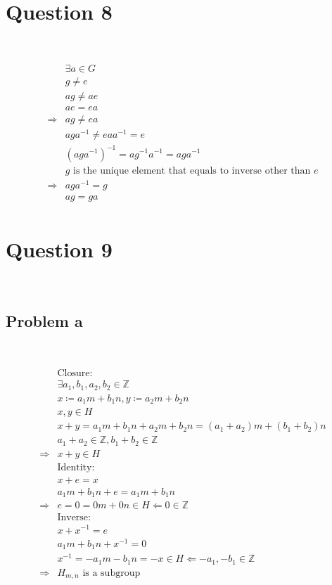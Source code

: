 \documentclass{article}
\begin{document}
\newpage

\section*{Question 8}

~

\begin{equation*}
    \begin{split}
        &\exists a\in G\\
        &g\ne e\\
        &ag\ne ae\\
        &ae=ea\\
        \Rightarrow&ag\ne ea\\
        &aga^{-1}\ne eaa^{-1}=e\\
        &(aga^{-1})^{-1}=ag^{-1}a^{-1}=aga^{-1}\\
        &g\text{ is the unique element that equals to inverse other than }e\\
        \Rightarrow&aga^{-1}=g\\
        &ag=ga\\
    \end{split}
\end{equation*}

\newpage

\section*{Question 9}

~

\subsection*{Problem a}

~

\begin{equation*}
    \begin{split}
        &\text{Closure}:\\
        &\exists a_1,b_1,a_2,b_2\in\mathbb{Z} \\
        &x\coloneqq a_1m+b_1n,y\coloneqq a_2m+b_2n\\
        &x,y\in H\\
        &x+y=a_1m+b_1n+a_2m+b_2n=(a_1+a_2)m+(b_1+b_2)n\\
        &a_1+a_2\in\mathbb{Z} ,b_1+b_2\in\mathbb{Z} \\
        \Rightarrow&x+y\in H\\
        &\text{Identity}:\\
        &x+e=x\\
        &a_1m+b_1n+e=a_1m+b_1n\\
        \Rightarrow&e=0=0m+0n\in H\Leftarrow0\in\mathbb{Z} \\
        &\text{Inverse}:\\
        &x+x^{-1}=e\\
        &a_1m+b_1n+x^{-1}=0\\
        &x^{-1}=-a_1m-b_1n=-x\in H\Leftarrow -a_1,-b_1\in \mathbb{Z} \\
        \Rightarrow&H_{m,n}\text{ is a subgroup}
    \end{split}
\end{equation*}
\end{document}
